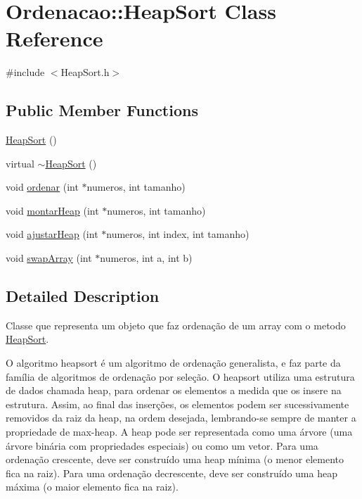 \hypertarget{classOrdenacao_1_1HeapSort}{
\section{Ordenacao::HeapSort Class Reference}
\label{classOrdenacao_1_1HeapSort}
}


{\ttfamily \#include $<$HeapSort.h$>$}

\subsection*{Public Member Functions}
\begin{DoxyCompactItemize}
\item 
\hyperlink{classOrdenacao_1_1HeapSort_ad5ce11165f8658234e52c0caa9bbe74d}{HeapSort} ()
\item 
virtual \hyperlink{classOrdenacao_1_1HeapSort_a2437a7ff240c2053a6274c94532150d7}{$\sim$HeapSort} ()
\item 
void \hyperlink{classOrdenacao_1_1HeapSort_aa2d7e90b9d9d85bc910768be73c82fef}{ordenar} (int $\ast$numeros, int tamanho)
\item 
void \hyperlink{classOrdenacao_1_1HeapSort_adea736e2cae0490f05426b9d953ab6ad}{montarHeap} (int $\ast$numeros, int tamanho)
\item 
void \hyperlink{classOrdenacao_1_1HeapSort_ac4ad66bc64cb09d6e4e13225331bce98}{ajustarHeap} (int $\ast$numeros, int index, int tamanho)
\item 
void \hyperlink{classOrdenacao_1_1HeapSort_a713072ec96f203059a09c70f4fba86ba}{swapArray} (int $\ast$numeros, int a, int b)
\end{DoxyCompactItemize}


\subsection{Detailed Description}
Classe que representa um objeto que faz ordenação de um array com o metodo \hyperlink{classOrdenacao_1_1HeapSort}{HeapSort}.

O algoritmo heapsort é um algoritmo de ordenação generalista, e faz parte da família de algoritmos de ordenação por seleção. O heapsort utiliza uma estrutura de dados chamada heap, para ordenar os elementos a medida que os insere na estrutura. Assim, ao final das inserções, os elementos podem ser sucessivamente removidos da raiz da heap, na ordem desejada, lembrando-\/se sempre de manter a propriedade de max-\/heap. A heap pode ser representada como uma árvore (uma árvore binária com propriedades especiais) ou como um vetor. Para uma ordenação crescente, deve ser construído uma heap mínima (o menor elemento fica na raiz). Para uma ordenação decrescente, deve ser construído uma heap máxima (o maior elemento fica na raiz).

